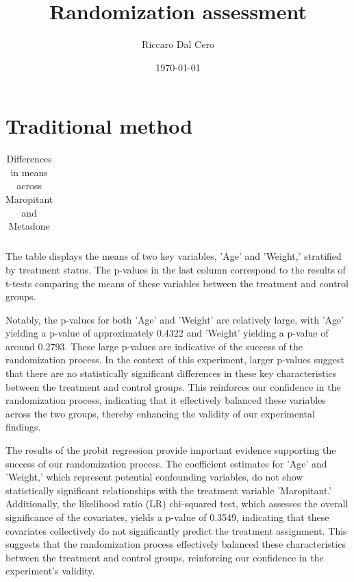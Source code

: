 \documentclass{article}
\begin{document}
\title{Randomization assessment}
\author{Riccaro Dal Cero}
\date{\today}
\maketitle
\section{Traditional method}
\begin{table}[htbp]
    \centering
    \caption{Differences in means across Maropitant and Metadone}
    \begin{tabular}{ccc}
    
    \end{tabular}
\end{table}
The table displays the means of two key variables, 'Age' and 'Weight,' stratified by treatment status. The p-values in
the last column correspond to the results of t-tests comparing the means of these variables between the treatment and
control groups. \\
\par
Notably, the p-values for both 'Age' and 'Weight' are relatively large, with 'Age' yielding a p-value of approximately
0.4322 and 'Weight' yielding a p-value of around 0.2793. These large p-values are indicative of the success of the
randomization process. In the context of this experiment, larger p-values suggest that there are no statistically
significant differences in these key characteristics between the treatment and control groups. This reinforces our
confidence in the randomization process, indicating that it effectively balanced these variables across the two groups,
thereby enhancing the validity of our experimental findings.

The results of the probit regression provide important evidence supporting the success of our randomization process. The
coefficient estimates for 'Age' and 'Weight,' which represent potential confounding variables, do not show statistically
significant relationships with the treatment variable 'Maropitant.' Additionally, the likelihood ratio (LR) chi-squared
test, which assesses the overall significance of the covariates, yields a p-value of 0.3549, indicating that these
covariates collectively do not significantly predict the treatment assignment. This suggests that the randomization
process effectively balanced these characteristics between the treatment and control groups, reinforcing our confidence
in the experiment's validity. 
\end{document}

